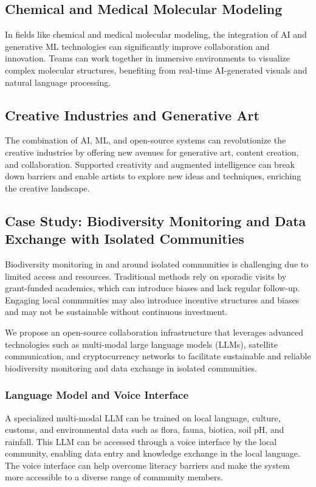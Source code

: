 \subsection{Chemical and Medical Molecular Modeling}
In fields like chemical and medical molecular modeling, the integration of AI and generative ML technologies can significantly improve collaboration and innovation. Teams can work together in immersive environments to visualize complex molecular structures, benefiting from real-time AI-generated visuals and natural language processing.

\subsection{Creative Industries and Generative Art}
The combination of AI, ML, and open-source systems can revolutionize the creative industries by offering new avenues for generative art, content creation, and collaboration. Supported creativity and augmented intelligence can break down barriers and enable artists to explore new ideas and techniques, enriching the creative landscape.

\subsection{Case Study: Biodiversity Monitoring and Data Exchange with Isolated Communities}
Biodiversity monitoring in and around isolated communities is challenging due to limited access and resources. Traditional methods rely on sporadic visits by grant-funded academics, which can introduce biases and lack regular follow-up. Engaging local communities may also introduce incentive structures and biases and may not be sustainable without continuous investment.

We propose an open-source collaboration infrastructure that leverages advanced technologies such as multi-modal large language models (LLMs), satellite communication, and cryptocurrency networks to facilitate sustainable and reliable biodiversity monitoring and data exchange in isolated communities.

\subsubsection{Language Model and Voice Interface}
A specialized multi-modal LLM can be trained on local language, culture, customs, and environmental data such as flora, fauna, biotica, soil pH, and rainfall. This LLM can be accessed through a voice interface by the local community, enabling data entry and knowledge exchange in the local language. The voice interface can help overcome literacy barriers and make the system more accessible to a diverse range of community members.

